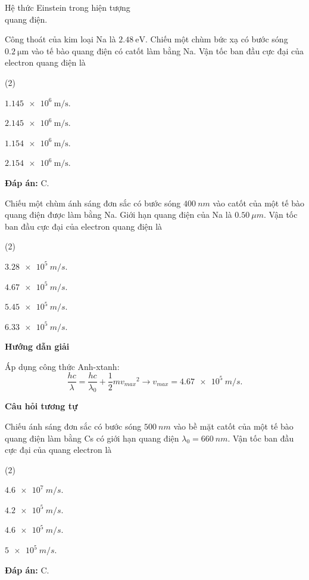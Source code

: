 \begin{dang}{Hệ thức Einstein trong hiện tượng\\ quang điện.}
{		Công thoát của kim loại Na là $\SI{2.48}{\electronvolt}$. Chiếu một chùm bức xạ có bước sóng $\SI{0.2}{\micro \meter}$ vào tế bào quang điện có catốt làm bằng Na. Vận tốc ban đầu cực đại của electron quang điện là
		\begin{mcq}(2)
			\item $\SI{1,145 e6}{\meter / \second}$.
			\item $\SI{2,145 e6}{\meter / \second}$.
			\item $\SI{1,154 e6}{\meter / \second}$.
			\item $\SI{2,154 e6}{\meter / \second}$.
		\end{mcq}
		
		\textbf{Đáp án:} C.
	}
	
	{Chiếu một chùm ánh sáng đơn sắc có bước sóng $ \SI{400}{nm} $ vào catốt của một tế bào quang điện được làm bằng Na. Giới hạn quang điện của Na là $ \SI{0,50}{\mu m} $. Vận tốc ban đầu cực đại của electron quang điện là
		\begin{mcq}(2)
			\item $ \SI{3,28 e5}{m/s} $.
			\item $ \SI{4,67 e5}{m/s} $.
			\item $ \SI{5,45 e5}{m/s} $.
			\item $ \SI{6,33 e5}{m/s} $.
		\end{mcq}
	}
	{\begin{center}
			\textbf{Hướng dẫn giải}
		\end{center}
		
		Áp dụng công thức Anh-xtanh:
		\begin{equation*}
			\dfrac{hc}{\lambda} = \dfrac{hc}{\lambda_{0}} + \dfrac{1}{2}m{v_{max}}^{2} \rightarrow v_{max} = \SI{4,67 e5}{m/s}.
		\end{equation*}
		
		\begin{center}
			\textbf{Câu hỏi tương tự}
		\end{center}
		
		Chiếu ánh sáng đơn sắc có bước sóng $ \SI{500}{nm} $ vào bề mặt catốt của một tế bào quang điện làm bằng Cs có giới hạn quang điện $ \lambda_{0} = \SI{660}{nm} $.  Vận tốc ban đầu cực đại của quang electron là
		
		\begin{mcq}(2)
			\item $ \SI{4,6 e7}{m/s} $.
			\item $ \SI{4,2 e5}{m/s} $.
			\item $ \SI{4,6 e5}{m/s} $.
			\item $ \SI{5 e5}{m/s} $.
		\end{mcq}
		
		\textbf{Đáp án:} C.
	}
	
\end{dang}


